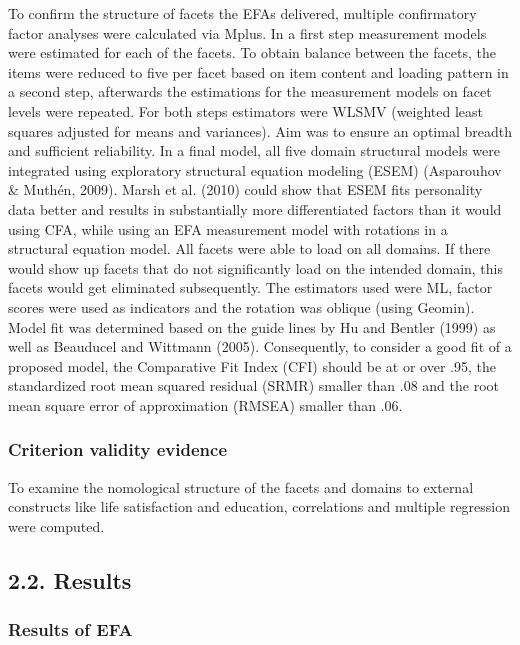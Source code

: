 \documentclass[,man,floatsintext]{apa6}
\theoremstyle{definition}
\theoremstyle{definition}
\theoremstyle{definition}
\theoremstyle{remark}
\begin{document}
To confirm the structure of facets the EFAs delivered, multiple
confirmatory factor analyses were calculated via Mplus. In a first step
measurement models were estimated for each of the facets. To obtain
balance between the facets, the items were reduced to five per facet
based on item content and loading pattern in a second step, afterwards
the estimations for the measurement models on facet levels were
repeated. For both steps estimators were WLSMV (weighted least squares
adjusted for means and variances). Aim was to ensure an optimal breadth
and sufficient reliability. In a final model, all five domain structural
models were integrated using exploratory structural equation modeling
(ESEM) (Asparouhov \& Muthén, 2009). Marsh et al. (2010) could show that
ESEM fits personality data better and results in substantially more
differentiated factors than it would using CFA, while using an EFA
measurement model with rotations in a structural equation model. All
facets were able to load on all domains. If there would show up facets
that do not significantly load on the intended domain, this facets would
get eliminated subsequently. The estimators used were ML, factor scores
were used as indicators and the rotation was oblique (using Geomin).
Model fit was determined based on the guide lines by Hu and Bentler
(1999) as well as Beauducel and Wittmann (2005). Consequently, to
consider a good fit of a proposed model, the Comparative Fit Index (CFI)
should be at or over .95, the standardized root mean squared residual
(SRMR) smaller than .08 and the root mean square error of approximation
(RMSEA) smaller than .06.

\hypertarget{criterion-validity-evidence}{%
\subsubsection{Criterion validity
evidence}\label{criterion-validity-evidence}}

To examine the nomological structure of the facets and domains to
external constructs like life satisfaction and education, correlations
and multiple regression were computed.

\hypertarget{results}{%
\subsection{2.2. Results}\label{results}}

\hypertarget{results-of-efa}{%
\subsubsection{Results of EFA}\label{results-of-efa}}
\end{document}
